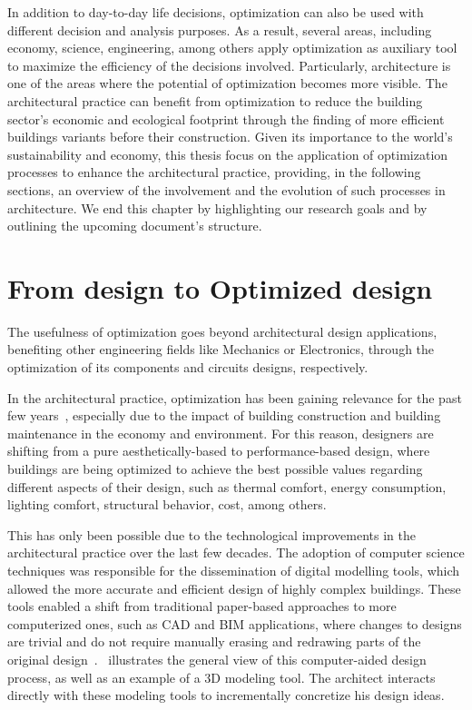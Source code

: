 	In addition to day-to-day life decisions, optimization can also be used with different decision and analysis purposes. As a result, several areas, including economy, science, engineering, among others apply optimization as auxiliary tool to maximize the efficiency of the decisions involved. Particularly, architecture is one of the areas where the potential of optimization becomes more visible. The architectural practice can benefit from optimization to reduce the building sector's economic and ecological footprint through the finding of more efficient buildings variants before their construction. Given its importance to the world's sustainability and economy, this thesis focus on the application of optimization processes to enhance the architectural practice, providing, in the following sections, an overview of the involvement and the evolution of such processes in architecture. We end this chapter by highlighting our research goals and by outlining the upcoming document's structure.

\section{From design to Optimized design}
	
	The usefulness of optimization goes beyond architectural design applications, benefiting other engineering fields like Mechanics or Electronics, through the optimization of its components and circuits designs, respectively. 
	
	In the architectural practice, optimization has been gaining relevance for the past few years~\cite{Cichocka2017SURVEY}, especially due to the impact of building construction and building maintenance in the economy and environment. For this reason, designers are shifting from a pure aesthetically-based to performance-based design, where buildings are being optimized to achieve the best possible values regarding different aspects of their design, such as thermal comfort, energy consumption, lighting comfort, structural behavior, cost, among others.

	This has only been possible due to the technological improvements in the architectural practice over the last few decades. The adoption of computer science techniques was responsible for the dissemination of digital modelling tools, which allowed the more accurate and efficient design of highly complex buildings. These tools enabled a shift from traditional paper-based approaches to more computerized ones, such as \ac{CAD} and \ac{BIM} applications, where changes to designs are trivial and do not require manually erasing and redrawing parts of the original design~\cite{Ferreira2015GD}.~ illustrates the general view of this computer-aided design process, as well as an example of a 3D modeling tool. The architect interacts directly with these modeling tools to incrementally concretize his design ideas.
	
